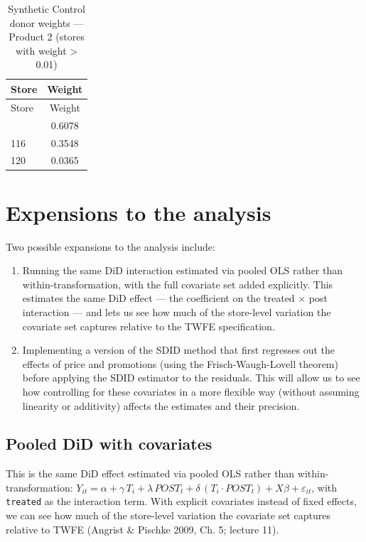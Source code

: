 \documentclass[
  letterpaper,
  DIV=11,
  numbers=noendperiod]{scrartcl}
\providecommand{\tightlist}{%
  \setlength{\itemsep}{0pt}\setlength{\parskip}{0pt}}
\begin{document}
\begin{longtable}[]{@{}lc@{}}
\caption{Synthetic Control donor weights --- Product 2 (stores with
weight \textgreater{} 0.01)}\tabularnewline
\toprule\noalign{}
Store & Weight \\
\midrule\noalign{}
\endfirsthead
\toprule\noalign{}
Store & Weight \\
\midrule\noalign{}
\endhead
\bottomrule\noalign{}
\endlastfoot
110 & 0.6078 \\
116 & 0.3548 \\
120 & 0.0365 \\
\end{longtable}

\section{Expensions to the analysis}\label{expensions-to-the-analysis}

Two possible expansions to the analysis include:

\begin{enumerate}
\def\labelenumi{\arabic{enumi}.}
\tightlist
\item
  Running the same DiD interaction estimated via pooled OLS rather than
  within-transformation, with the full covariate set added explicitly.
  This estimates the same DiD effect --- the coefficient on the treated
  × post interaction --- and lets us see how much of the store-level
  variation the covariate set captures relative to the TWFE
  specification.
\item
  Implementing a version of the SDID method that first regresses out the
  effects of price and promotions (using the Frisch-Waugh-Lovell
  theorem) before applying the SDID estimator to the residuals. This
  will allow us to see how controlling for these covariates in a more
  flexible way (without assuming linearity or additivity) affects the
  estimates and their precision.
\end{enumerate}

\subsection{Pooled DiD with
covariates}\label{pooled-did-with-covariates}

This is the same DiD effect estimated via pooled OLS rather than
within-transformation:
\(Y_{it} = \alpha + \gamma\, T_i + \lambda\, POST_t + \delta\, (T_i \cdot POST_t) + X\beta + \varepsilon_{it}\),
with \texttt{treated} as the interaction term. With explicit covariates
instead of fixed effects, we can see how much of the store-level
variation the covariate set captures relative to TWFE (Angrist \&
Pischke 2009, Ch. 5; lecture 11).
\end{document}
